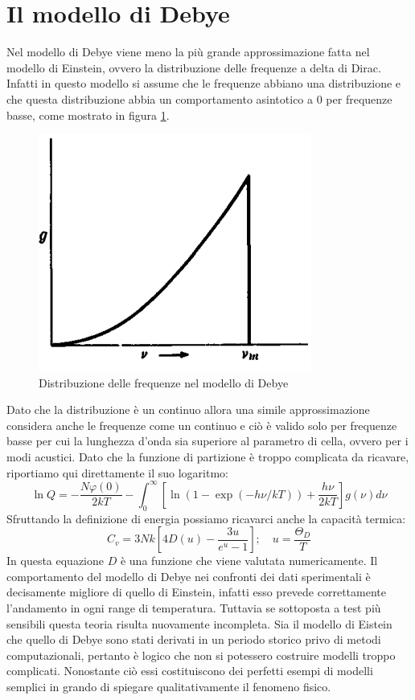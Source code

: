 \documentclass[oneside]{amsbook}
\numberwithin{section}{chapter}
\numberwithin{equation}{section}
\numberwithin{figure}{section}
\begin{document}
\section{Il modello di Debye}
Nel modello di Debye viene meno la più grande approssimazione fatta nel modello di Einstein, ovvero la distribuzione delle frequenze a delta di Dirac. Infatti in questo modello si assume che le frequenze abbiano una distribuzione e che questa distribuzione abbia un comportamento asintotico a 0 per frequenze basse, come mostrato in figura \ref{AA5}.
\begin{figure}
\centering
\caption{Distribuzione delle frequenze nel modello di Debye}\label{AA5}
\includegraphics[scale=0.5]{AA5}
\end{figure}
Dato che la distribuzione è un continuo allora una simile approssimazione considera anche le frequenze come un continuo e ciò è valido solo per frequenze basse per cui la lunghezza d'onda sia superiore al parametro di cella, ovvero per i modi acustici.
Dato che la funzione di partizione è troppo complicata da ricavare, riportiamo qui direttamente il suo logaritmo:
\begin{equation}
\ln Q=-\frac{N\varphi(0)}{2kT}-\int_0^\infty\left[\ln(1-\exp(-h\nu/kT))+\frac{h\nu}{2kT}\right]g(\nu)d\nu
\end{equation}
Sfruttando la definizione di energia possiamo ricavarci anche la capacità termica:
\begin{equation}
C_v=3Nk\left[4D(u)-\frac{3u}{e^u-1}\right];\quad u=\frac{\Theta_D}{T}
\end{equation}
In questa equazione $D$ è una funzione che viene valutata numericamente.
Il comportamento del modello di Debye nei confronti dei dati sperimentali è decisamente migliore di quello di Einstein, infatti esso prevede correttamente l'andamento in ogni range di temperatura. Tuttavia se sottoposta a test più sensibili questa teoria risulta nuovamente incompleta. Sia il modello di Eistein che quello di Debye sono stati derivati in un periodo storico privo di metodi computazionali, pertanto è logico che non si potessero costruire modelli troppo complicati. Nonostante ciò essi costituiscono dei perfetti esempi di modelli semplici in grando di spiegare qualitativamente il fenomeno fisico.
\newpage
\printindex
\end{document}
